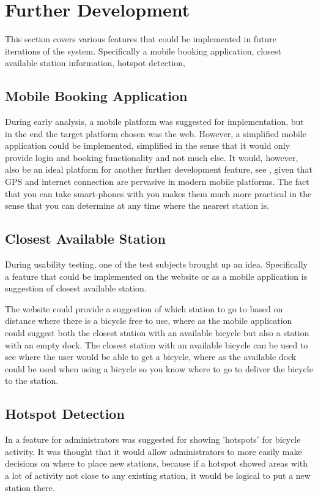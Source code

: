 \section{Further Development}\label{sec:furdev}
This section covers various features that could be implemented in future iterations of the system. Specifically a mobile booking application, closest available station information, hotspot detection,

\subsection{Mobile Booking Application}\label{sec:fd-mobileapp}
During early analysis, a mobile platform was suggested for implementation, but in the end the target platform chosen was the web. 
However, a simplified mobile application could be implemented, simplified in the sense that it would only provide login and booking functionality and not much else.
It would, however, also be an ideal platform for another further development feature, see , given that GPS and internet connection are pervasive in modern mobile platforms.
The fact that you can take smart-phones with you makes them much more practical in the sense that you can determine at any time where the nearest station is.

\subsection{Closest Available Station}\label{subsec:closeststation}
During usability testing, one of the test subjects brought up an idea.
Specifically a feature that could be implemented on the website or as a mobile application is suggestion of closest available station.

The website could provide a suggestion of which station to go to based on distance where there is a bicycle free to use, where as the mobile application could suggest both the closest station with an available bicycle but also a station with an empty dock.
The closest station with an available bicycle can be used to see where the user would be able to get a bicycle, where as the available dock could be used when using a bicycle so you know where to go to deliver the bicycle to the station.

\subsection{Hotspot Detection}
In  a feature for administrators was suggested for showing 'hotspots' for bicycle activity. 
It was thought that it would allow administrators to more easily make decisions on where to place new stations, because if a hotspot showed areas with a lot of activity not close to any existing station, it would be logical to put a new station there.

